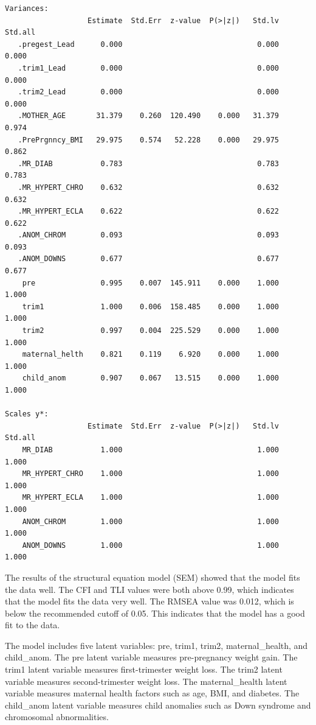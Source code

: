 \documentclass[
  letterpaper,
  DIV=11,
  numbers=noendperiod]{scrartcl}
\begin{document}
\begin{verbatim}
Variances:
                   Estimate  Std.Err  z-value  P(>|z|)   Std.lv  Std.all
   .pregest_Lead      0.000                               0.000    0.000
   .trim1_Lead        0.000                               0.000    0.000
   .trim2_Lead        0.000                               0.000    0.000
   .MOTHER_AGE       31.379    0.260  120.490    0.000   31.379    0.974
   .PrePrgnncy_BMI   29.975    0.574   52.228    0.000   29.975    0.862
   .MR_DIAB           0.783                               0.783    0.783
   .MR_HYPERT_CHRO    0.632                               0.632    0.632
   .MR_HYPERT_ECLA    0.622                               0.622    0.622
   .ANOM_CHROM        0.093                               0.093    0.093
   .ANOM_DOWNS        0.677                               0.677    0.677
    pre               0.995    0.007  145.911    0.000    1.000    1.000
    trim1             1.000    0.006  158.485    0.000    1.000    1.000
    trim2             0.997    0.004  225.529    0.000    1.000    1.000
    maternal_helth    0.821    0.119    6.920    0.000    1.000    1.000
    child_anom        0.907    0.067   13.515    0.000    1.000    1.000

Scales y*:
                   Estimate  Std.Err  z-value  P(>|z|)   Std.lv  Std.all
    MR_DIAB           1.000                               1.000    1.000
    MR_HYPERT_CHRO    1.000                               1.000    1.000
    MR_HYPERT_ECLA    1.000                               1.000    1.000
    ANOM_CHROM        1.000                               1.000    1.000
    ANOM_DOWNS        1.000                               1.000    1.000
\end{verbatim}

The results of the structural equation model (SEM) showed that the model
fits the data well. The CFI and TLI values were both above 0.99, which
indicates that the model fits the data very well. The RMSEA value was
0.012, which is below the recommended cutoff of 0.05. This indicates
that the model has a good fit to the data.

The model includes five latent variables: pre, trim1, trim2,
maternal\_health, and child\_anom. The pre latent variable measures
pre-pregnancy weight gain. The trim1 latent variable measures
first-trimester weight loss. The trim2 latent variable measures
second-trimester weight loss. The maternal\_health latent variable
measures maternal health factors such as age, BMI, and diabetes. The
child\_anom latent variable measures child anomalies such as Down
syndrome and chromosomal abnormalities.
\end{document}
